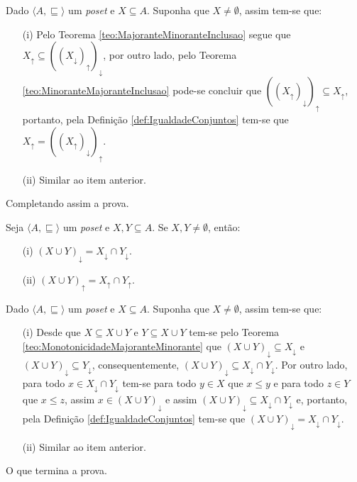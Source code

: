 \begin{prova}
	Dado $\langle A, \sqsubseteq \rangle$ um \textit{poset} e $X \subseteq A$. Suponha que $X \neq \emptyset$, assim tem-se que:
	\begin{itemize}
		\item[(i)] Pelo Teorema \ref{teo:MajoranteMinoranteInclusao} segue que $X_\uparrow \subseteq ((X_\downarrow)_\uparrow)_\downarrow$, por outro lado, pelo Teorema \ref{teo:MinoranteMajoranteInclusao} pode-se concluir que $((X_\uparrow)_\downarrow)_\uparrow \subseteq X_\uparrow$, portanto, pela Definição \ref{def:IgualdadeConjuntos} tem-se que  $X_\uparrow = ((X_\uparrow)_\downarrow)_\uparrow$.
		\item[(ii)] Similar ao item anterior.
	\end{itemize}
	Completando assim a prova.
\end{prova}

\begin{teorema}\label{teo:RotacaoMajoranteMinorante}
	Seja $\langle A, \sqsubseteq \rangle$ um \textit{poset} e $X, Y \subseteq A$. Se $X, Y \neq \emptyset$, então:
	\begin{itemize}
		\item[(i)]  $(X \cup Y)_\downarrow = X_\downarrow \cap Y_\downarrow$.
		\item[(ii)] $(X \cup Y)_\uparrow = X_\uparrow \cap Y_\uparrow$.
	\end{itemize}
\end{teorema}

\begin{prova}
	Dado $\langle A, \sqsubseteq \rangle$ um \textit{poset} e $X \subseteq A$. Suponha que $X \neq \emptyset$, assim tem-se que:
	\begin{itemize}
		\item[(i)] Desde que $X \subseteq X \cup Y$ e  $Y \subseteq X \cup Y$ tem-se pelo Teorema \ref{teo:MonotonicidadeMajoranteMinorante} que $(X \cup Y)_\downarrow \subseteq X_\downarrow$ e  $(X \cup Y)_\downarrow \subseteq Y_\downarrow $, consequentemente, $(X \cup Y)_\downarrow \subseteq X_\downarrow \cap Y_\downarrow$. Por outro lado, para todo $x \in X_\downarrow \cap Y_\downarrow$ tem-se para todo $y \in X$ que $x \leq y$ e para todo $z \in Y$ que $x \leq z$, assim $x \in (X \cup Y)_\downarrow$ e assim $(X \cup Y)_\downarrow \subseteq X_\downarrow \cap Y_\downarrow$ e, portanto, pela Definição \ref{def:IgualdadeConjuntos}  tem-se que $(X \cup Y)_\downarrow = X_\downarrow \cap Y_\downarrow$.
		\item[(ii)] Similar ao item anterior.
	\end{itemize}
	O que termina a prova.
\end{prova}

